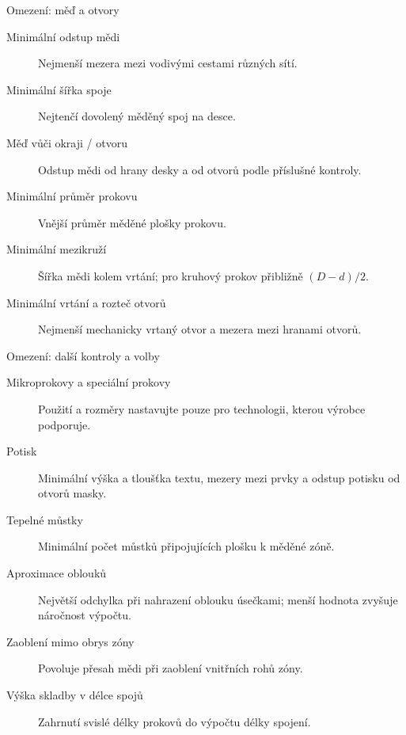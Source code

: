 \documentclass{beamer}
\begin{document}
\begin{frame}{Omezení: měď a otvory}
	\small
	\begin{description}
		\item[Minimální odstup mědi] Nejmenší mezera mezi vodivými cestami různých sítí.
		\item[Minimální šířka spoje] Nejtenčí dovolený měděný spoj na desce.
		\item[Měď vůči okraji / otvoru] Odstup mědi od hrany desky a od otvorů podle příslušné kontroly.
		\item[Minimální průměr prokovu] Vnější průměr měděné plošky prokovu.
		\item[Minimální mezikruží] Šířka mědi kolem vrtání; pro kruhový prokov přibližně $(D-d)/2$.
		\item[Minimální vrtání a rozteč otvorů] Nejmenší mechanicky vrtaný otvor a mezera mezi hranami otvorů.
	\end{description}
\end{frame}

\begin{frame}{Omezení: další kontroly a volby}
	\small
	\begin{description}
		\item[Mikroprokovy a speciální prokovy] Použití a rozměry nastavujte pouze pro technologii, kterou výrobce podporuje.
		\item[Potisk] Minimální výška a tloušťka textu, mezery mezi prvky a odstup potisku od otvorů masky.
		\item[Tepelné můstky] Minimální počet můstků připojujících plošku k měděné zóně.
		\item[Aproximace oblouků] Největší odchylka při nahrazení oblouku úsečkami; menší hodnota zvyšuje náročnost výpočtu.
		\item[Zaoblení mimo obrys zóny] Povoluje přesah mědi při zaoblení vnitřních rohů zóny.
		\item[Výška skladby v délce spojů] Zahrnutí svislé délky prokovů do výpočtu délky spojení.
	\end{description}
\end{frame}
\end{document}
